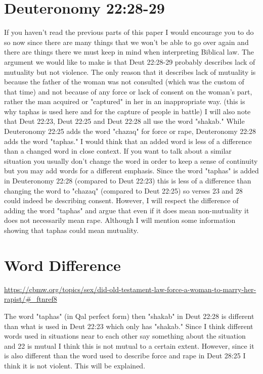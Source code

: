 \documentclass[11pt]{article}
\begin{document}
\section{Deuteronomy 22:28-29}
If you haven't read the previous parts of this paper I would encourage you to do so now since there are many things that we won't be able to go over again and there are things there we must keep in mind when interpreting Biblical law. The argument we would like to make is that Deut 22:28-29 probably describes lack of mutuality but not violence. The only reason that it describes lack of mutuality is because the father of the woman was not consulted (which was the custom of that time) and not because of any force or lack of consent on the woman's part, rather the man acquired or "captured" in her in an inappropriate way. (this is why taphas is used here and for the capture of people in battle) I will also note that Deut 22:23, Deut 22:25 and Deut 22:28 all use the word "shakab." While Deuteronomy 22:25 adds the word "chazaq" for force or rape, Deuteronomy 22:28 adds the word "taphas." I would think that an added word is less of a difference than a changed word in close context. If you want to talk about a similar situation you usually don't change the word in order to keep a sense of continuity but you may add words for a different emphasis. Since the word "taphas" is added in Deuteronomy 22:28 (compared to Deut 22:23) this is less of a difference than changing the word to "chazaq" (compared to Deut 22:25) so verses 23 and 28 could indeed be describing consent. However, I will respect the difference of adding the word "taphas" and argue that even if it does mean non-mutuality it does not necessarily mean rape. Although I will mention some information showing that taphas could mean mutuality.

\section{Word Difference}

\url{https://cbmw.org/topics/sex/did-old-testament-law-force-a-woman-to-marry-her-rapist/#_ftnref8}

The word "taphas" (in Qal perfect form) then "shakab" in Deut 22:28 is different than what is used in Deut 22:23 which only has "shakab." Since I think different words used in situations near to each other say something about the situation and 22 is mutual I think this is not mutual to a certain extent. However, since it is also different than the word used to describe force and rape in Deut 28:25 I think it is not violent. This will be explained. 
\end{document}
